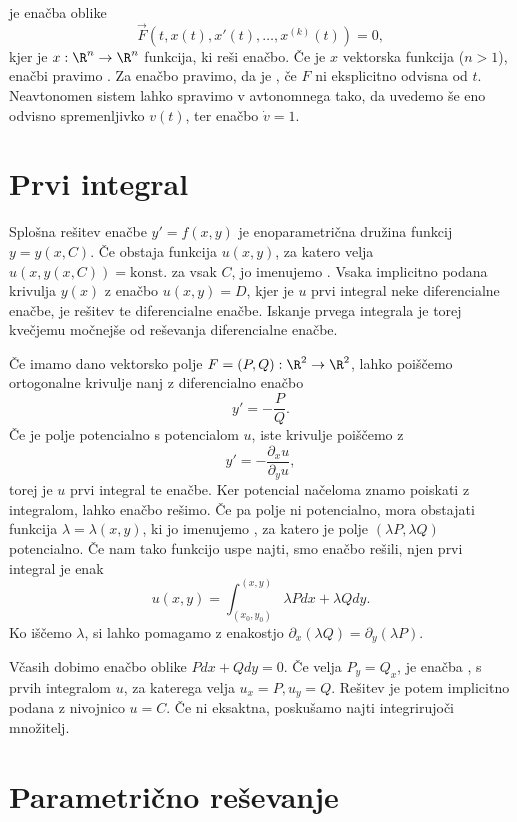  je enačba oblike
\[
  \vec{F}(t, x(t), x'(t), \ldots, x^{(k)}(t)) = 0,
\]
kjer je $x: \R^n \to \R^n$ funkcija, ki reši enačbo.
Če je $x$ vektorska funkcija ($n > 1$), enačbi pravimo .
Za enačbo pravimo, da je , če $F$ ni eksplicitno odvisna od
$t$.
Neavtonomen sistem lahko spravimo v avtonomnega tako, da uvedemo še eno odvisno
spremenljivko $v(t)$, ter enačbo $\dot{v} = 1$.

\section{Prvi integral}%

Splošna rešitev enačbe $y' = f(x, y)$ je enoparametrična družina funkcij $y =
y(x, C)$.
Če obstaja funkcija $u(x, y)$, za katero velja $u(x, y(x, C)) = \text{konst.}$
za vsak $C$, jo imenujemo .
Vsaka implicitno podana krivulja $y(x)$ z enačbo $u(x, y) = D$, kjer je $u$ prvi
integral neke diferencialne enačbe, je rešitev te diferencialne enačbe.
Iskanje prvega integrala je torej kvečjemu močnejše od reševanja diferencialne
enačbe.

Če imamo dano vektorsko polje $F = (P, Q): \R^2 \to \R^2$, lahko poiščemo
ortogonalne krivulje nanj z diferencialno enačbo
\[
  y' = - \frac{P}{Q}.
\]
Če je polje potencialno s potencialom $u$, iste krivulje poiščemo z
\[
  y' = - \frac{\partial_x u}{\partial_y u},
\]
torej je $u$ prvi integral te enačbe.
Ker potencial načeloma znamo poiskati z integralom, lahko enačbo rešimo.
Če pa polje ni potencialno, mora obstajati funkcija $\lambda = \lambda(x, y)$,
ki jo imenujemo , za katero je polje $(\lambda P,
\lambda Q)$ potencialno.
Če nam tako funkcijo uspe najti, smo enačbo rešili, njen prvi integral je enak
\[
  u(x, y) = \int_{(x_0, y_0)}^{(x, y)} \lambda P dx + \lambda Q dy.
\]
Ko iščemo $\lambda$, si lahko pomagamo z enakostjo $\partial_x (\lambda Q) =
\partial_y (\lambda P)$.

Včasih dobimo enačbo oblike $P dx + Q dy = 0$.
Če velja $P_y = Q_x$, je enačba , s prvih integralom $u$, za
katerega velja $u_x = P, u_y = Q$.
Rešitev je potem implicitno podana z nivojnico $u = C$.
Če ni eksaktna, poskušamo najti integrirujoči množitelj.

\section{Parametrično reševanje}%

